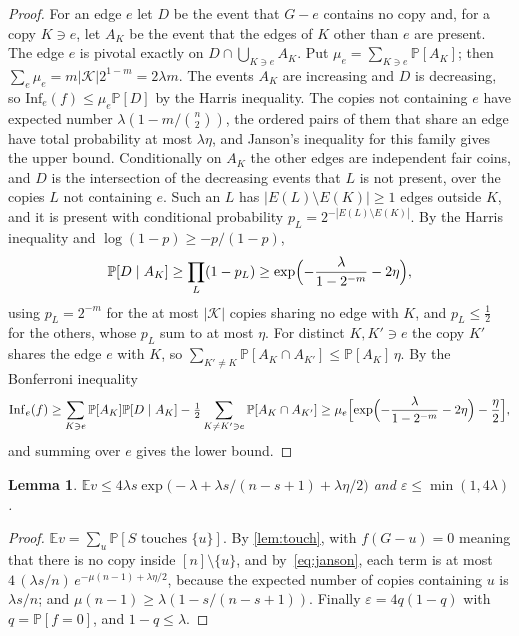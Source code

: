 \documentclass[11pt]{amsart}
\newtheorem{lemma}[theorem]{Lemma}
\theoremstyle{remark}
\newcommand{\E}{\mathbb{E}}
\renewcommand{\Pr}{\mathbb{P}}
\newcommand{\Inf}{\mathrm{Inf}}
\newcommand{\eps}{\varepsilon}
\newcommand{\K}{\mathcal K}
\begin{document}
\begin{proof}
For an edge $e$ let $D$ be the event that $G-e$ contains no copy and, for a copy $K\ni e$, let $A_K$ be the event that
the edges of $K$ other than $e$ are present. The edge $e$ is pivotal exactly on $D\cap\bigcup_{K\ni e}A_K$. Put
$\mu_e=\sum_{K\ni e}\Pr[A_K]$; then $\sum_e\mu_e=m|\K|2^{1-m}=2\lambda m$. The events $A_K$ are increasing and $D$ is
decreasing, so $\Inf_e(f)\le\mu_e\Pr[D]$ by the Harris inequality. The copies not containing $e$ have expected number
$\lambda(1-m/\binom n2)$, the ordered pairs of them that share an edge have total probability at most $\lambda\eta$, and
Janson's inequality for this family gives the upper bound. Conditionally on $A_K$ the
other edges are independent fair coins, and $D$ is the intersection of the decreasing events that $L$ is not
present, over the copies $L$ not containing $e$. Such an $L$ has $|E(L)\setminus E(K)|\ge1$ edges outside $K$, and it is
present with conditional probability $p_L=2^{-|E(L)\setminus E(K)|}$. By the Harris inequality and
$\log(1-p)\ge-p/(1-p)$,
\[
\Pr[D\mid A_K]\ge\prod_L(1-p_L)\ge\exp\Bigl(-\frac\lambda{1-2^{-m}}-2\eta\Bigr),
\]
using $p_L=2^{-m}$ for the at most $|\K|$ copies sharing no edge with $K$, and $p_L\le\frac12$ for the others, whose
$p_L$ sum to at most $\eta$. For distinct $K,K'\ni e$ the copy $K'$ shares the edge $e$ with $K$, so
$\sum_{K'\ne K}\Pr[A_K\cap A_{K'}]\le\Pr[A_K]\,\eta$. By the Bonferroni inequality
\[
\Inf_e(f)\ge\sum_{K\ni e}\Pr[A_K]\Pr[D\mid A_K]-\tfrac12\sum_{K\ne K'\ni e}\Pr[A_K\cap A_{K'}]
\ge\mu_e\Bigl[\exp\Bigl(-\frac\lambda{1-2^{-m}}-2\eta\Bigr)-\frac\eta2\Bigr],
\]
and summing over $e$ gives the lower bound.
\end{proof}

\begin{lemma}\label{lem:vertex}
$\E v\le4\lambda s\exp\bigl(-\lambda+\lambda s/(n-s+1)+\lambda\eta/2\bigr)$ and $\eps\le\min(1,4\lambda)$.
\end{lemma}

\begin{proof}
$\E v=\sum_u\Pr[S\text{ touches }\{u\}]$. By \cref{lem:touch}, with $f(G-u)=0$ meaning that there is no copy inside
$[n]\setminus\{u\}$, and by~\eqref{eq:janson}, each term is at most $4\,(\lambda s/n)\,e^{-\mu(n-1)+\lambda\eta/2}$,
because the expected number of copies containing $u$ is $\lambda s/n$; and $\mu(n-1)\ge\lambda(1-s/(n-s+1))$.
Finally $\eps=4q(1-q)$ with $q=\Pr[f=0]$, and $1-q\le\lambda$.
\end{proof}
\end{document}
